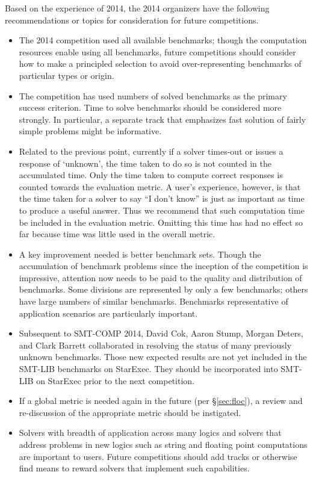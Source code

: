 \documentclass[twoside,11pt]{article}
\begin{document}
Based on the experience of 2014, the 2014 organizers have the following recommendations or topics for consideration for future competitions.
\begin{itemize}
\item The 2014 competition used all available benchmarks; though the computation resources enable using all benchmarks, future competitions should consider how to make a principled selection to avoid over-representing benchmarks of particular types or origin.
\item The competition has used numbers of solved benchmarks as the primary success criterion. Time to solve benchmarks should be considered more strongly. In particular, a separate track that emphasizes fast solution of fairly simple problems might be informative.
\item Related to the previous point, currently if a solver times-out or issues a response of `unknown', the time taken to do so is not counted in the accumulated time. Only the time taken to compute correct responses is counted towards the evaluation metric.
A user's experience, however, is that the time taken for a solver to say ``I don't know'' is just as important as time to produce a useful answer. Thus we recommend that such 
computation time be included in the evaluation metric. Omitting this time has had no effect so far because time was little used in the overall metric.
\item A key improvement needed is better benchmark sets. Though the accumulation of benchmark problems since the inception of the competition is impressive, attention now needs to be paid to the quality and distribution of benchmarks. Some divisions are represented by only a few benchmarks; others have large numbers of similar benchmarks.
Benchmarks representative of application scenarios are particularly important.
\item Subsequent to SMT-COMP 2014, David Cok, Aaron Stump, Morgan Deters, and Clark Barrett collaborated in resolving the status of many previously unknown benchmarks. Those new expected results are not yet included in the SMT-LIB benchmarks on StarExec. They should be incorporated into SMT-LIB on StarExec prior to the next competition.
\item If a global metric is needed again in the future (per \S\ref{sec:floc}), a review and re-discussion of the appropriate metric should be instigated.
\item Solvers with breadth of application across many logics and solvers that address problems in new logics such as string and floating point computations are important to users. Future competitions should add tracks or otherwise find means to reward solvers that implement such capabilities.

\end{itemize}
\end{document}
